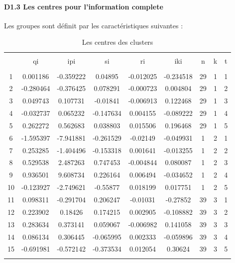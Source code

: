\documentclass[11pt,]{article}
\let\oldparagraph\paragraph
\renewcommand{\paragraph}[1]{\oldparagraph{#1}\mbox{}}
\begin{document}
\FloatBarrier

\newpage

\hypertarget{d1.3-les-centres-pour-linformation-complete}{%
\paragraph{D1.3 Les centres pour l'information
complete}\label{d1.3-les-centres-pour-linformation-complete}}

Les groupes sont définit par les caractéristiques suivantes :

\FloatBarrier

\begin{table}[!htbp] \centering 
  \caption{Les centres des clusters} 
  \label{} 
\begin{tabular}{@{\extracolsep{5pt}} ccccccccc} 
\\[-1.8ex]\hline 
\hline \\[-1.8ex] 
 & qi & ipi & si & ri & iki & n & k & t \\ 
\hline \\[-1.8ex] 
1 & 0.001186 & -0.359222 & 0.04895 & -0.012025 & -0.234518 & 29 & 1 & 1 \\ 
2 & -0.280464 & -0.376425 & 0.078291 & -0.000723 & 0.004804 & 29 & 1 & 2 \\ 
3 & 0.049743 & 0.107731 & -0.01841 & -0.006913 & 0.122468 & 29 & 1 & 3 \\ 
4 & -0.032737 & 0.065232 & -0.147634 & 0.004155 & -0.089222 & 29 & 1 & 4 \\ 
5 & 0.262272 & 0.562683 & 0.038803 & 0.015506 & 0.196468 & 29 & 1 & 5 \\ 
6 & -1.595397 & -7.941881 & -0.261529 & -0.02149 & -0.049931 & 1 & 2 & 1 \\ 
7 & 0.253285 & -1.404496 & -0.153318 & 0.001641 & -0.013255 & 1 & 2 & 2 \\ 
8 & 0.529538 & 2.487263 & 0.747453 & -0.004844 & 0.080087 & 1 & 2 & 3 \\ 
9 & 0.936501 & 9.608734 & 0.226164 & 0.006494 & -0.034652 & 1 & 2 & 4 \\ 
10 & -0.123927 & -2.749621 & -0.55877 & 0.018199 & 0.017751 & 1 & 2 & 5 \\ 
11 & 0.098311 & -0.291704 & 0.206247 & -0.01031 & -0.27852 & 39 & 3 & 1 \\ 
12 & 0.223902 & 0.18426 & 0.174215 & 0.002905 & -0.108882 & 39 & 3 & 2 \\ 
13 & 0.283634 & 0.373141 & 0.059067 & -0.006982 & 0.141058 & 39 & 3 & 3 \\ 
14 & 0.086134 & 0.306445 & -0.065995 & 0.002333 & -0.059896 & 39 & 3 & 4 \\ 
15 & -0.691981 & -0.572142 & -0.373534 & 0.012054 & 0.30624 & 39 & 3 & 5 \\ 
\hline \\[-1.8ex] 
\end{tabular} 
\end{table}
\end{document}
